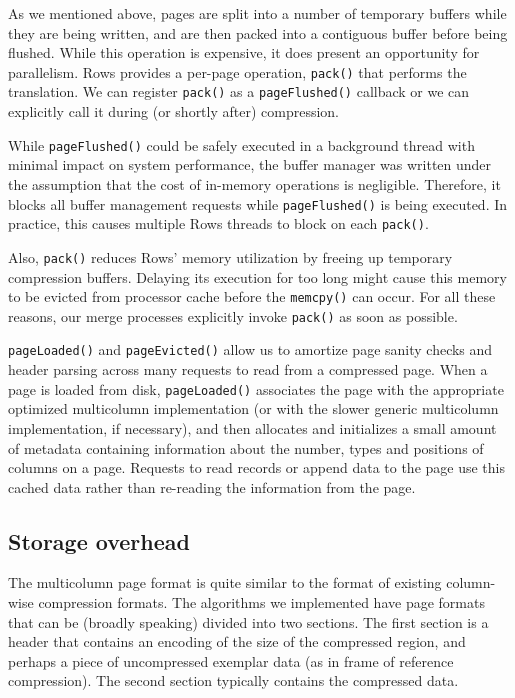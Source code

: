 \documentclass{sig-alternate-sigmod08}
\newcommand{\rows}{Rows\xspace}
\newcommand{\rowss}{Rows'\xspace}
\begin{document}
As we mentioned above, pages are split into a number of temporary
buffers while they are being written, and are then packed into a
contiguous buffer before being flushed.  While this operation is
expensive, it does present an opportunity for parallelism.  \rows
provides a per-page operation, {\tt pack()} that performs the
translation.  We can register {\tt pack()} as a {\tt pageFlushed()}
callback or we can explicitly call it during (or shortly after)
compression.

While {\tt pageFlushed()} could be safely executed in a background
thread with minimal impact on system performance, the buffer manager
was written under the assumption that the cost of in-memory operations
is negligible.  Therefore, it blocks all buffer management requests
while {\tt pageFlushed()} is being executed.  In practice, this causes
multiple  \rows threads to block on each {\tt pack()}.

Also, {\tt pack()} reduces \rowss memory utilization by freeing up
temporary compression buffers.  Delaying its execution for too long
might cause this memory to be evicted from processor cache before the
{\tt memcpy()} can occur.  For all these reasons, our merge processes
explicitly invoke {\tt pack()} as soon as possible.

{\tt pageLoaded()} and {\tt pageEvicted()} allow us to amortize page
sanity checks and header parsing across many requests to read from a
compressed page.  When a page is loaded from disk, {\tt pageLoaded()}
associates the page with the appropriate optimized multicolumn
implementation (or with the slower generic multicolumn implementation,
if necessary), and then allocates and initializes a small amount of
metadata containing information about the number, types and positions
of columns on a page.  Requests to read records or append data to the
page use this cached data rather than re-reading the information from
the page.

\subsection{Storage overhead}

The multicolumn page format is quite similar to the format of existing
column-wise compression formats.  The algorithms we implemented have
page formats that can be (broadly speaking) divided into two sections.
The first section is a header that contains an encoding of the size of
the compressed region, and perhaps a piece of uncompressed exemplar
data (as in frame of reference compression).  The second section
typically contains the compressed data.
\end{document}
